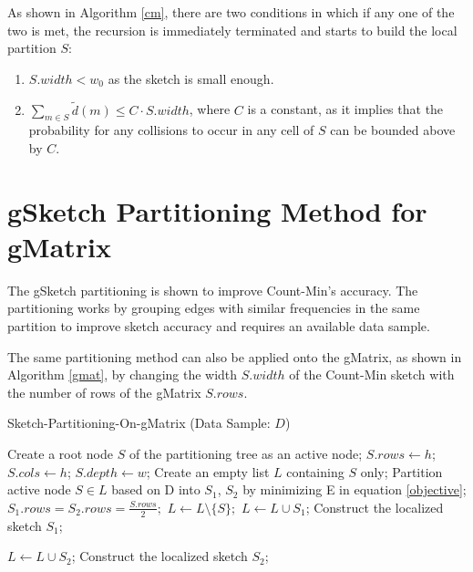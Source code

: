 As shown in Algorithm \ref{cm}, there are two conditions in which if any one of the two is met, the recursion is immediately terminated and starts to build the local partition $S$:

\begin{enumerate}
\item $S.width < w_0$ as the sketch is small enough.
\item $\sum_{m\in S}\tilde{d}(m) \leq C \cdot S.width$, where $C$ is a constant, as it implies that the probability for any collisions to occur in any cell of $S$ can be bounded above by $C$.
\end{enumerate}


\section{gSketch Partitioning Method for gMatrix}

The gSketch partitioning\cite{DBLP} is shown to improve Count-Min's\cite{cormode2005improved} accuracy. The partitioning works by grouping edges with similar frequencies in the same partition to improve sketch accuracy and requires an available data sample.

The same partitioning method can also be applied onto the gMatrix, as shown in Algorithm \ref{gmat}, by changing the width $S.width$ of the Count-Min sketch with the number of rows of the gMatrix $S.rows$.

\begin{algorithm}
\caption{Sketch-Partitioning-On-gMatrix (Data Sample: $D$)}\label{gmat}
\begin{algorithmic}[1]

\State Create a root node $S$ of the partitioning tree as an
active node;
\State $S.rows \gets h$;
\State $S.cols \gets h$;
\State $S.depth \gets w$;
\State Create an empty list $L$ containing $S$ only;
\State Partition active node $S \in L$ based on D into $S_1$, $S_2$ by minimizing E in equation \ref{objective};
\State $S_1.rows = S_2.rows = \frac{S.rows}{2};$
\State $L \gets L \setminus \{ S \};$
\State $L \gets L \cup S_1$;
\Else
\State Construct the localized sketch $S_1$;
\EndIf

\State $L \gets L \cup S_2$;
\Else
\State Construct the localized sketch $S_2$;
\EndIf

\EndWhile

\end{algorithmic}
\end{algorithm}

